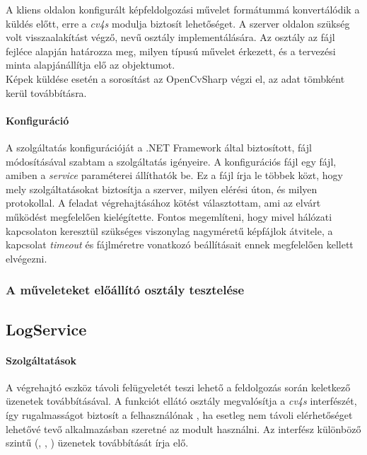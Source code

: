 A kliens oldalon konfigurált képfeldolgozási művelet  formátummá konvertálódik a küldés előtt, erre a \emph{cv4s}  modulja biztosít lehetőséget. A szerver oldalon szükség volt visszaalakítást végző,  nevű osztály implementálására. Az osztály az  fájl fejléce alapján határozza meg, milyen típusú művelet érkezett, és a  tervezési minta alapjánállítja elő az objektumot.\\
Képek küldése esetén a sorosítást az OpenCvSharp végzi el, az adat  tömbként kerül továbbításra.

\paragraph{Konfiguráció} A szolgáltatás konfigurációját a .NET Framework által biztosított,  fájl módosításával szabtam a szolgáltatás igényeire. A konfigurációs fájl egy  fájl, amiben a \emph{service} paraméterei állíthatók be. Ez a fájl írja le többek közt, hogy mely szolgáltatásokat biztosítja a szerver, milyen elérési úton, és milyen protokollal. A feladat végrehajtásához  kötést választottam, ami az elvárt működést megfelelően kielégítette. Fontos megemlíteni, hogy mivel hálózati kapcsolaton keresztül szükséges viszonylag nagyméretű képfájlok átvitele, a kapcsolat \emph{timeout} és fájlméretre vonatkozó beállításait ennek megfelelően kellett elvégezni.

\subsubsection{A műveleteket előállító osztály tesztelése}

\subsection{LogService}
\paragraph{Szolgáltatások} A végrehajtó eszköz távoli felügyeletét teszi lehető a feldolgozás során keletkező üzenetek továbbításával. A funkciót ellátó osztály megvalósítja a \emph{cv4s}  interfészét, így rugalmasságot biztosít a felhasználónak , ha esetleg nem távoli elérhetőséget lehetővé tevő alkalmazásban szeretné az  modult használni. Az interfész különböző szintű (, , ) üzenetek továbbítását írja elő.

